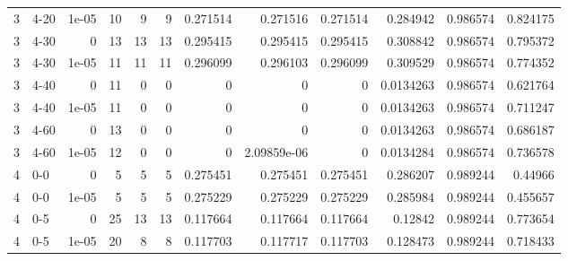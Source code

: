 \begin{tabular}{rlrrrrrrrrrr}
     3 & 4-20   &      1e-05 &          10 &                 9 &                 9 &     0.271514    &     0.271516    &      0.271514    &        0.284942  &               0.986574 &           0.824175 \\
     3 & 4-30   &      0     &          13 &                13 &                13 &     0.295415    &     0.295415    &      0.295415    &        0.308842  &               0.986574 &           0.795372 \\
     3 & 4-30   &      1e-05 &          11 &                11 &                11 &     0.296099    &     0.296103    &      0.296099    &        0.309529  &               0.986574 &           0.774352 \\
     3 & 4-40   &      0     &          11 &                 0 &                 0 &     0           &     0           &      0           &        0.0134263 &               0.986574 &           0.621764 \\
     3 & 4-40   &      1e-05 &          11 &                 0 &                 0 &     0           &     0           &      0           &        0.0134263 &               0.986574 &           0.711247 \\
     3 & 4-60   &      0     &          13 &                 0 &                 0 &     0           &     0           &      0           &        0.0134263 &               0.986574 &           0.686187 \\
     3 & 4-60   &      1e-05 &          12 &                 0 &                 0 &     0           &     2.09859e-06 &      0           &        0.0134284 &               0.986574 &           0.736578 \\
     4 & 0-0    &      0     &           5 &                 5 &                 5 &     0.275451    &     0.275451    &      0.275451    &        0.286207  &               0.989244 &           0.44966  \\
     4 & 0-0    &      1e-05 &           5 &                 5 &                 5 &     0.275229    &     0.275229    &      0.275229    &        0.285984  &               0.989244 &           0.455657 \\
     4 & 0-5    &      0     &          25 &                13 &                13 &     0.117664    &     0.117664    &      0.117664    &        0.12842   &               0.989244 &           0.773654 \\
     4 & 0-5    &      1e-05 &          20 &                 8 &                 8 &     0.117703    &     0.117717    &      0.117703    &        0.128473  &               0.989244 &           0.718433 \\

\end{tabular}
